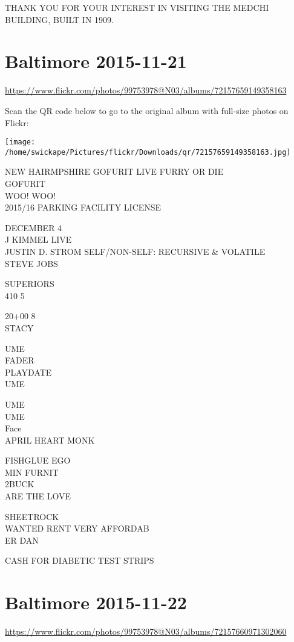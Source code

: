 \documentclass[10pt,letterpaper]{article}
\begin{document}
THANK YOU FOR YOUR INTEREST IN VISITING THE MEDCHI BUILDING, BUILT IN 1909.
\pagebreak

\section*{Baltimore 2015-11-21}

\url{https://www.flickr.com/photos/99753978@N03/albums/72157659149358163}

Scan the QR code below to go to the original album with full-size photos on Flickr:

\texttt{[image: /home/swickape/Pictures/flickr/Downloads/qr/72157659149358163.jpg]}
\pagebreak

NEW HAIRMPSHIRE GOFURIT LIVE FURRY OR DIE\\
GOFURIT\\
WOO!  WOO!\\
2015/16 PARKING FACILITY LICENSE

DECEMBER 4\\
J KIMMEL LIVE\\
JUSTIN D. STROM SELF/NON{-}SELF: RECURSIVE \& VOLATILE\\
STEVE JOBS

SUPERIORS\\
410 5

20+00 8\\
STACY

UME\\
FADER\\
PLAYDATE\\
UME

UME\\
UME\\
Face\\
APRIL HEART MONK

FISHGLUE EGO\\
MIN FURNIT\\
2BUCK\\
ARE THE LOVE

SHEETROCK\\
WANTED RENT VERY AFFORDAB\\
ER DAN

CASH FOR DIABETIC TEST STRIPS
\pagebreak

\section*{Baltimore 2015-11-22}

\url{https://www.flickr.com/photos/99753978@N03/albums/72157660971302060}
\end{document}
